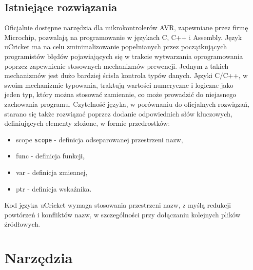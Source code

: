 \subsection{Istniejące rozwiązania}
Oficjalnie dostępne narzędzia dla mikrokontrolerów AVR, zapewniane przez firmę Microchip, pozwalają na programowanie w językach C, C++ i Assembly. Język uCricket ma na celu zminimalizowanie popełnianych przez początkujących programistów błędów pojawiających się w trakcie wytwarzania oprogramowania poprzez zapewnienie stosownych mechanizmów prewencji. Jednym z takich mechanizmów jest dużo bardziej ścisła kontrola typów danych. Języki C/C++, w swoim  mechanizmie typowania, traktują wartości numeryczne i logiczne jako jeden typ, który można stosować zamiennie, co może prowadzić do niejasnego zachowania programu. 
Czytelność języka, w porównaniu do oficjalnych rozwiązań, starano się także rozwiązać poprzez dodanie odpowiednich słów kluczowych, definiujących elementy złożone, w formie przedrostków:
\begin{itemize}
\item scope \lstinline|scope| - definicja odseparowanej przestrzeni nazw,
\item func - definicja funkcji,
\item var - definicja zmiennej,
\item ptr - definicja wskaźnika.
\end{itemize}
Kod języka uCricket wymaga stosowania przestrzeni nazw, z myślą redukcji powtórzeń i konfliktów nazw, w szczególności przy dołączaniu kolejnych plików źródłowych.


\section{Narzędzia}

